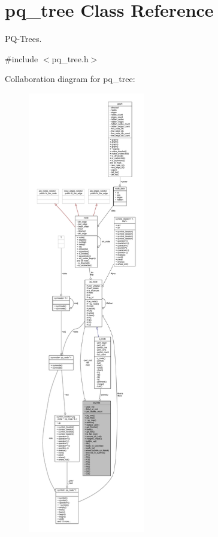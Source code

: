 \hypertarget{classpq__tree}{}\section{pq\+\_\+tree Class Reference}
\label{classpq__tree}


P\+Q-\/\+Trees.  




{\ttfamily \#include $<$pq\+\_\+tree.\+h$>$}



Collaboration diagram for pq\+\_\+tree\+:\nopagebreak
\begin{figure}[H]
\begin{center}
\leavevmode
\includegraphics[height=550pt]{classpq__tree__coll__graph}
\end{center}
\end{figure}
